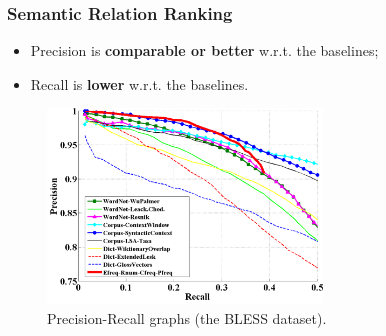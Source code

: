 



\begin{frame}
\frametitle{Semantic Relation Ranking}

\begin{itemize}
  \item Precision is \textbf{comparable or better} w.r.t. the baselines;
  \item Recall is \textbf{lower} w.r.t. the baselines.
\end{itemize}

\begin{figure}	
	\centering
	\includegraphics[width=0.65\textwidth]{figures/pr2-mlg}
	\caption{Precision-Recall graphs (the BLESS dataset).
	}
\end{figure}

\end{frame}





